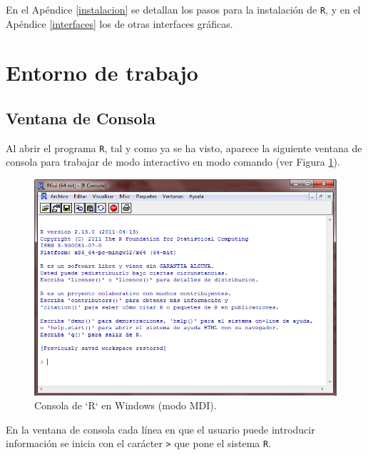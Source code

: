 \documentclass[]{book}
\begin{document}
En el Apéndice \ref{instalacion} se detallan los pasos para la
instalación de \texttt{R}, y en el Apéndice \ref{interfaces} los de
otras interfaces gráficas.

\section{Entorno de trabajo}\label{entorno-de-trabajo}

\subsection{Ventana de Consola}\label{ventana-de-consola}

Al abrir el programa \texttt{R}, tal y como ya se ha visto, aparece la
siguiente ventana de consola para trabajar de modo interactivo en modo
comando (ver Figura \ref{fig:consola}).

\begin{figure}[!htb]

{\centering \includegraphics[width=0.7\linewidth]{figuras/consola} 

}

\caption{Consola de `R` en Windows (modo MDI).}\label{fig:consola}
\end{figure}

En la ventana de consola cada línea en que el usuario puede introducir
información se inicia con el carácter \texttt{\textgreater{}} que pone
el sistema \texttt{R}.
\end{document}
